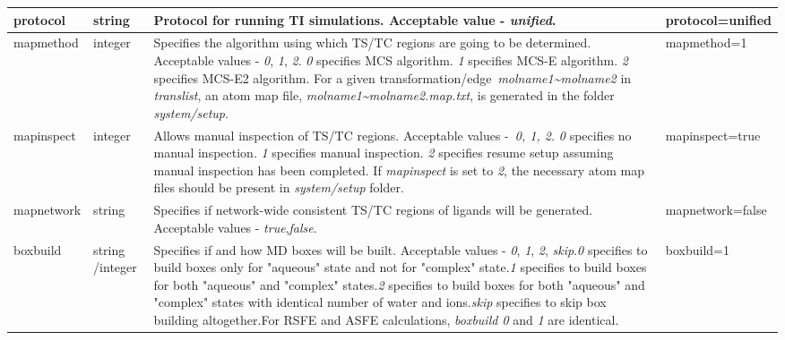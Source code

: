 \documentclass[11pt,letterpaper,titlepage]{article}
\begin{document}
\begin{footnotesize}
\begin{landscape}
\begin{center}
\begin{longtable}[1]{p{3cm}|p{0.5cm}|p{11cm}|p{4cm}}
\hline
protocol           & string          & Protocol for running TI simulations. Acceptable value - \textit{unified}.     & protocol=unified     \\ 
\hline
	mapmethod          & integer         & Specifies the algorithm using which TS/TC regions are going to be determined. Acceptable values - \textit{0}, \textit{1}, \textit{2}. \newline \textit{0} specifies MCS algorithm. \newline \textit{1} specifies MCS-E algorithm. \newline \textit{2} specifies MCS-E2 algorithm. \newline For a given transformation/edge~\textit{molname1\textasciitilde{}molname2} in \textit{translist}, an atom map file, \textit{molname1\textasciitilde{}molname2.map.txt}, is generated in the folder \textit{system/setup}.   & mapmethod=1      \\ 
\hline
	mapinspect         & integer         & Allows manual inspection of TS/TC regions. Acceptable values -~\textit{0, 1, 2.} \newline \textit{0} specifies no manual inspection. \newline\textit{1} specifies manual inspection. \newline \textit{2} specifies resume setup assuming manual inspection has been completed. \newline If \textit{mapinspect} is set to \textit{2}, the necessary atom map files should be present in \textit{system/setup} folder. & mapinspect=true \\
\hline
mapnetwork         & string          & Specifies if network-wide consistent TS/TC regions of ligands will be generated. Acceptable values - \textit{true},\textit{false}.    & mapnetwork=false     \\ 
\hline
boxbuild           & string /\newline integer  & Specifies if and how MD boxes will be built. Acceptable values - \textit{0}, \textit{1}, \textit{2}, \textit{skip}.\newline \textit{0} specifies to build boxes only for "aqueous" state and not for "complex" state.\newline \textit{1} specifies to build boxes for both "aqueous" and "complex" states.\newline \textit{2} specifies to build boxes for both "aqueous" and "complex" states with identical number of water and ions.\newline \textit{skip} specifies to skip box building altogether.\newline For RSFE and ASFE calculations, \textit{boxbuild 0} and \textit{1} are identical. & boxbuild=1   \\ 

\end{longtable}
\end{center}
\end{landscape}
\end{footnotesize}
\end{document}
